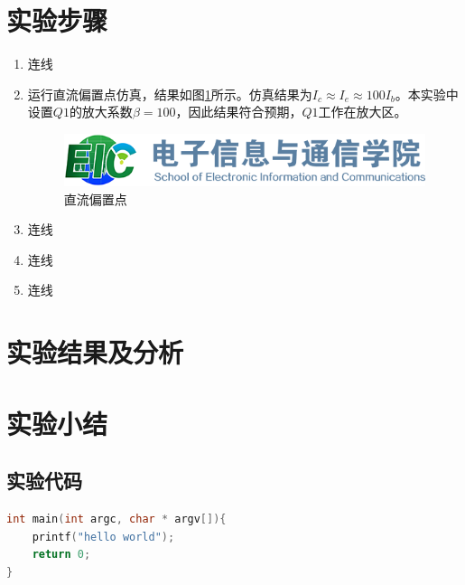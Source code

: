 \documentclass[12pt]{article}
\begin{document}
\section{实验步骤}

\begin{enumerate}
    \item 连线
    \item 运行直流偏置点仿真，结果如图\ref{fig:simdc}所示。仿真结果为$I_c \approx I_e \approx 100I_b$。本实验中设置$Q1$的放大系数$\beta=100$，因此结果符合预期，$Q1$工作在放大区。

\begin{figure}[htbp]
    \centering
    \includegraphics[scale=0.3]{figures/logo-hust-eic.png}
    \caption{直流偏置点}
    \label{fig:simdc}
\end{figure}

    \item 连线
    \item 连线
    \item 连线
\end{enumerate}


\section{实验结果及分析}

\section{实验小结}


\begin{appendices}

\section{实验代码}
% 
\begin{lstlisting}[language=C]
int main(int argc, char * argv[]){
    printf("hello world");
    return 0;
}
\end{lstlisting}
\end{appendices}
\end{document}
